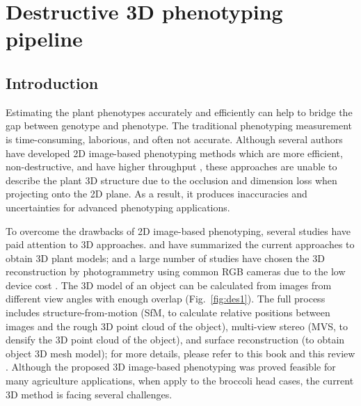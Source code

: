 \chapter{Destructive 3D phenotyping pipeline}

\section{Introduction}

Estimating the plant phenotypes accurately and efficiently can help to bridge the gap between genotype and phenotype. The traditional phenotyping measurement is time-consuming, laborious, and often not accurate. Although several authors have developed 2D image-based phenotyping methods which are more efficient, non-destructive, and have higher throughput \citep{yang_greenness_2015,guo_easypcc_2017,zou_broccoli_2019}, these approaches are unable to describe the plant 3D structure due to the occlusion and dimension loss when projecting onto the 2D plane. As a result, it produces inaccuracies and uncertainties for advanced phenotyping applications.

To overcome the drawbacks of 2D image-based phenotyping, several studies have paid attention to 3D approaches. \citet{paulus_measuring_2019} and \citet{kochi_introduction_2021} have summarized the current approaches to obtain 3D plant models; and a large number of studies have chosen the 3D reconstruction by photogrammetry using common RGB cameras due to the low device cost \citep{xiao_estimating_2021,zermas_3d_2020,zhang_estimating_2016}. The 3D model of an object can be calculated from images from different view angles with enough overlap (Fig.~\ref{fig:des1}). The full process includes structure-from-motion (SfM, to calculate relative positions between images and the rough 3D point cloud of the object), multi-view stereo (MVS, to densify the 3D point cloud of the object), and surface reconstruction (to obtain object 3D mesh model); for more details, please refer to this book \citep{hartley_multiple_2000} and this review \citep{snavely_scene_2010}. Although the proposed 3D image-based phenotyping was proved feasible for many agriculture applications, when apply to the broccoli head cases, the current 3D method is facing several challenges.



